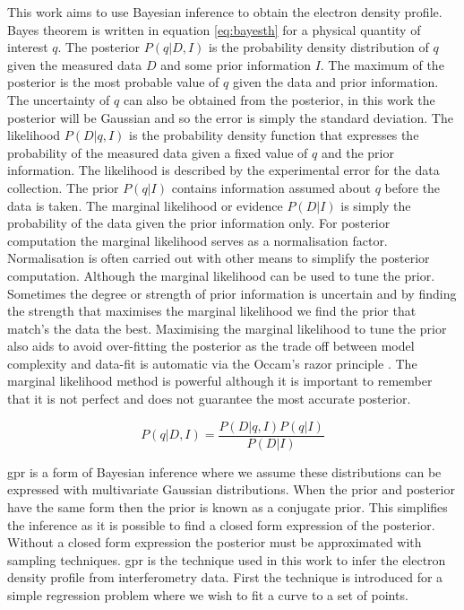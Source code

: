 This work aims to use Bayesian inference to obtain the electron density profile. Bayes theorem is written in equation \ref{eq:bayesth} for a physical quantity of interest $q$. The posterior $P(q|D,I)$ is the probability density distribution of $q$ given the measured data $D$ and some prior information $I$. The maximum of the posterior is the most probable value of $q$ given the data and prior information. The uncertainty of $q$ can also be obtained from the posterior, in this work the posterior will be Gaussian and so the error is simply the standard deviation. The likelihood $P(D|q,I)$ is the probability density function that expresses the probability of the measured data given a fixed value of $q$ and the prior information. The likelihood is described by the experimental error for the data collection. The prior $P(q|I)$ contains information assumed about $q$ before the data is taken. The marginal likelihood or evidence $P(D|I)$ is simply the probability of the data given the prior information only. For posterior computation the marginal likelihood serves as a normalisation factor. Normalisation is often carried out with other means to simplify the posterior computation. Although the marginal likelihood can be used to tune the prior. Sometimes the degree or strength of prior information is uncertain and by finding the strength that maximises the marginal likelihood we find the prior that match's the data the best. Maximising the marginal likelihood to tune the prior also aids to avoid over-fitting the posterior as the trade off between model complexity and data-fit is automatic via the Occam's razor principle \cite{oscraz}. The marginal likelihood method is powerful although it is important to remember that it is not perfect and does not guarantee the most accurate posterior.

\begin{equation} 
    P(q|D,I) = \frac{P(D|q,I) P(q|I)}{P(D|I)}
    \label{eq:bayesth}
\end{equation}

\gls{gpr} is a form of Bayesian inference where we assume these distributions can be expressed with multivariate Gaussian distributions. When the prior and posterior have the same form then the prior is known as a conjugate prior. This simplifies the inference as it is possible to find a closed form expression of the posterior. Without a closed form expression the posterior must be approximated with sampling techniques. \gls{gpr} is the technique used in this work to infer the electron density profile from interferometry data. First the technique is introduced for a simple regression problem where we wish to fit a curve to a set of points. 

